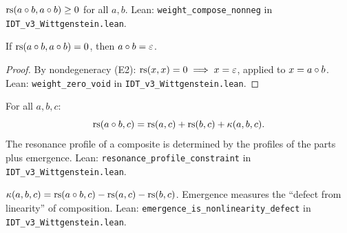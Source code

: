 \begin{theorem}
\label{thm:weight-nonneg}
$\mathrm{rs}(a \circ b, a \circ b) \geq 0$ for all $a, b$.
Lean: \texttt{weight\_compose\_nonneg} in \texttt{IDT\_v3\_Wittgenstein.lean}.
\end{theorem}

\begin{theorem}
\label{thm:zero-weight-void}
If $\mathrm{rs}(a \circ b, a \circ b) = 0$, then $a \circ b = \varepsilon$.
\end{theorem}

\begin{proof}
By nondegeneracy (E2): $\mathrm{rs}(x, x) = 0 \implies x = \varepsilon$, applied to
$x = a \circ b$.
Lean: \texttt{weight\_zero\_void} in \texttt{IDT\_v3\_Wittgenstein.lean}.
\end{proof}

\begin{theorem}
\label{thm:resonance-profile-constraint}
For all $a, b, c$:
\[
\mathrm{rs}(a \circ b, c) = \mathrm{rs}(a, c) + \mathrm{rs}(b, c) + \kappa(a, b, c).
\]
The resonance profile of a composite is determined by the profiles of the parts
plus emergence.
Lean: \texttt{resonance\_profile\_constraint} in
\texttt{IDT\_v3\_Wittgenstein.lean}.
\end{theorem}

\begin{theorem}
\label{thm:emergence-nonlinearity}
$\kappa(a, b, c) = \mathrm{rs}(a \circ b, c) - \mathrm{rs}(a, c) - \mathrm{rs}(b, c)$.
Emergence measures the ``defect from linearity'' of composition.
Lean: \texttt{emergence\_is\_nonlinearity\_defect} in
\texttt{IDT\_v3\_Wittgenstein.lean}.
\end{theorem}


